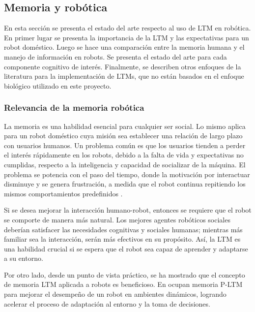  
\subsection{Memoria y robótica}\label{sec:mem_robotica}
En esta sección se presenta el estado del arte respecto al uso de LTM en robótica. En primer lugar se presenta la importancia de la LTM y las expectativas para un robot doméstico. Luego se hace una comparación entre la memoria humana y el manejo de información en robots.  Se presenta el estado del arte para cada componente cognitivo de interés. Finalmente, se describen otros enfoques de la literatura para la implementación de LTMs, que no están basados en el enfoque biológico utilizado en este proyecto.


\subsubsection{Relevancia de la memoria robótica}
La memoria es una habilidad esencial para cualquier ser social. Lo mismo aplica para un robot doméstico cuya misión sea establecer una relación de largo plazo con usuarios humanos. Un problema común es que los usuarios tienden a perder el interés rápidamente en los robots, debido a la falta de vida y expectativas no cumplidas, respecto a la inteligencia y capacidad de socializar de la máquina. El problema se potencia con el paso del tiempo, donde la motivación por interactuar disminuye y se genera frustración, a medida que el robot continua repitiendo los mismos comportamientos predefinidos \cite{Ho2009}.

Si se desea mejorar la interacción humano-robot, entonces se requiere que el robot se comporte de manera más natural. Los mejores agentes robóticos sociales deberían satisfacer las necesidades cognitivas y sociales humanas; mientras más familiar sea la interacción, serán más efectivos en su propósito. Así, la LTM es una habilidad crucial si se espera que el robot sea capaz de aprender y adaptarse a su entorno.


Por otro lado, desde un punto de vista práctico, se ha mostrado que el concepto de memoria LTM aplicada a robots es beneficioso. En \cite{Salgado2012} ocupan memoria P-LTM para mejorar el desempeño de un robot en ambientes dinámicos, logrando acelerar el proceso de adaptación al entorno y la toma de decisiones.




